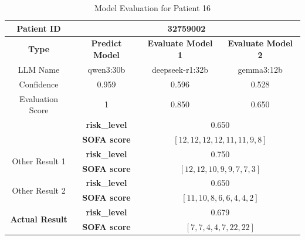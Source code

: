 \begin{table}[htbp]
 \centering
 \caption{Model Evaluation for Patient 16}
 \label{tab:patient16}
 \begin{tabular}{cccc}
 \toprule
 \textbf{ Patient ID } & \multicolumn{3}{c}{32759002} \\
 \midrule
 \textbf{ Type } & \textbf{ Predict Model } & \textbf{ Evaluate Model 1 } & \textbf{ Evaluate Model 2 } \\
 LLM Name & qwen3:30b & deepseek-r1:32b & gemma3:12b \\
 Confidence & 0.959 & 0.596 & 0.528 \\
 Evaluation Score & 1 & 0.850 & 0.650 \\
 \midrule
 \addlinespace
 \multirow{2}{*}{\textbf{ Best Result }} & \textbf{ risk\_level } & \multicolumn{2}{c}{0.650} \\
      & \textbf{ SOFA score } & \multicolumn{2}{c}{$[12, 12, 12, 12, 11, 11, 9, 8]$} \\
 \midrule
 \multirow{2}{*}{Other Result 1} & \textbf{ risk\_level } & \multicolumn{2}{c}{0.750} \\
      & \textbf{ SOFA score } & \multicolumn{2}{c}{$[12, 12, 10, 9, 9, 7, 7, 3]$} \\
 \midrule
 \multirow{2}{*}{Other Result 2} & \textbf{ risk\_level } & \multicolumn{2}{c}{0.650} \\
      & \textbf{ SOFA score } & \multicolumn{2}{c}{$[11, 10, 8, 6, 6, 4, 4, 2]$} \\
 \midrule
 \multirow{2}{*}{\textbf{ Actual Result }} & \textbf{ risk\_level } & \multicolumn{2}{c}{0.679} \\
      & \textbf{ SOFA score } & \multicolumn{2}{c}{$[7, 7, 4, 4, 7, 22, 22]$} \\
 \bottomrule
 \end{tabular}
\end{table}
